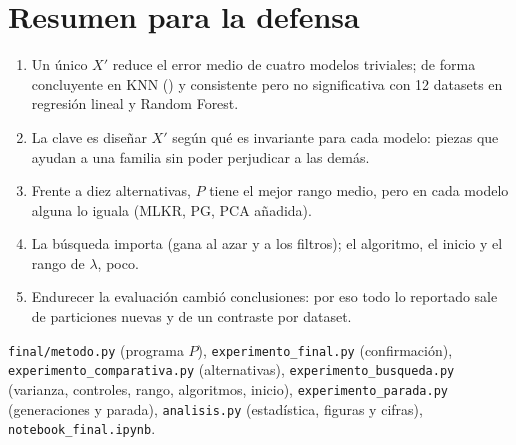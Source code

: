 \documentclass[apuntes]{uc3mmaster}
\begin{document}
\section{Resumen para la defensa}
\begin{resultado}
\begin{enumerate}
\item Un único $X'$ reduce el error medio de cuatro modelos triviales; de forma concluyente en KNN (\cambioKNN) y
consistente pero no significativa con 12 datasets en regresión lineal y Random Forest.
\item La clave es diseñar $X'$ según qué es invariante para cada modelo: piezas que ayudan a una familia sin poder
perjudicar a las demás.
\item Frente a diez alternativas, $P$ tiene el mejor rango medio, pero en cada modelo alguna lo iguala (MLKR, PG, PCA
añadida).
\item La búsqueda importa (gana al azar y a los filtros); el algoritmo, el inicio y el rango de $\lambda$, poco.
\item Endurecer la evaluación cambió conclusiones: por eso todo lo reportado sale de particiones nuevas y de un
contraste por dataset.
\end{enumerate}
\end{resultado}

\begin{nota}[Ficheros]
\texttt{final/metodo.py} (programa $P$), \texttt{experimento\_final.py} (confirmación),
\texttt{experimento\_comparativa.py} (alternativas), \texttt{experimento\_busqueda.py} (varianza, controles, rango,
algoritmos, inicio), \texttt{experimento\_parada.py} (generaciones y parada), \texttt{analisis.py} (estadística,
figuras y cifras), \texttt{notebook\_final.ipynb}.
\end{nota}
\end{document}
